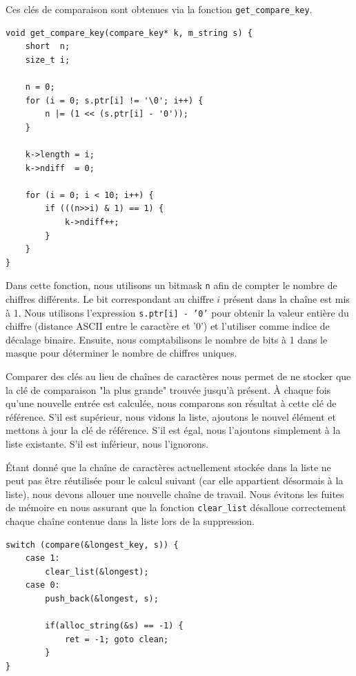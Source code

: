\documentclass[a4paper,11pt]{article}
\begin{document}
Ces clés de comparaison sont obtenues via la fonction \texttt{get\_compare\_key}.

\begin{verbatim}
void get_compare_key(compare_key* k, m_string s) {
    short  n;
    size_t i;
    
    n = 0;
    for (i = 0; s.ptr[i] != '\0'; i++) {
        n |= (1 << (s.ptr[i] - '0'));
    }
    
    k->length = i;
    k->ndiff  = 0;

    for (i = 0; i < 10; i++) {
        if (((n>>i) & 1) == 1) {
            k->ndiff++;
        }
    }
}
\end{verbatim}

Dans cette fonction, nous utilisons un bitmask \texttt{n} afin de compter le nombre de chiffres différents. Le bit correspondant au chiffre $i$ présent dans la chaîne est mis à 1. Nous utilisons l'expression \texttt{s.ptr[i] - '0'} pour obtenir la valeur entière du chiffre (distance ASCII entre le caractère et '0') et l'utiliser comme indice de décalage binaire. Ensuite, nous comptabilisons le nombre de bits à 1 dans le masque pour déterminer le nombre de chiffres uniques.

Comparer des clés au lieu de chaînes de caractères nous permet de ne stocker que la clé de comparaison "la plus grande" trouvée jusqu'à présent. À chaque fois qu'une nouvelle entrée est calculée, nous comparons son résultat à cette clé de référence. S'il est supérieur, nous vidons la liste, ajoutons le nouvel élément et mettons à jour la clé de référence. S'il est égal, nous l'ajoutons simplement à la liste existante. S'il est inférieur, nous l'ignorons.

Étant donné que la chaîne de caractères actuellement stockée dans la liste ne peut pas être réutilisée pour le calcul suivant (car elle appartient désormais à la liste), nous devons allouer une nouvelle chaîne de travail. Nous évitons les fuites de mémoire en nous assurant que la fonction \texttt{clear\_list} désalloue correctement chaque chaîne contenue dans la liste lors de la suppression.

\begin{verbatim}
switch (compare(&longest_key, s)) {
    case 1:
        clear_list(&longest);
    case 0:
        push_back(&longest, s);
        
        if(alloc_string(&s) == -1) {
            ret = -1; goto clean;
        }
}
\end{verbatim}
\end{document}
